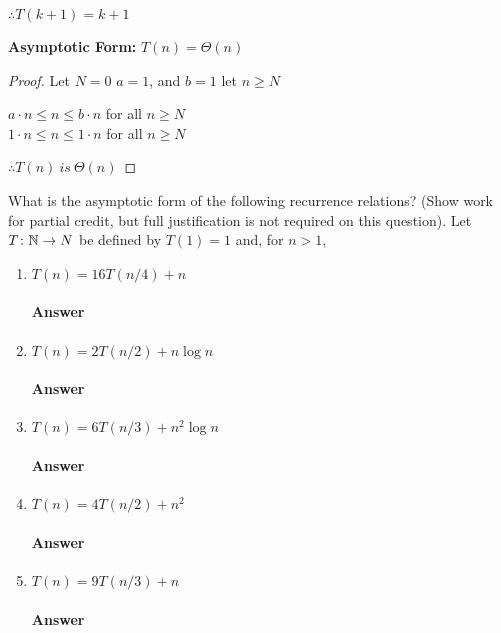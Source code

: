 \documentclass{article}
\begin{document}
$\therefore T(k+1)=k+1$

{\bf Asymptotic Form:} $T(n)=\Theta(n)$

\begin{proof}

Let $N = 0$
$a=1$, and $b= 1$
let $n \geq N$

$a \cdot n \leq n \leq b \cdot n$ for all $n \geq N$\\
$1 \cdot n \leq n \leq 1 \cdot n$ for all $n \geq N$

$\therefore T(n)\ is\ \Theta(n)$

\end{proof}




\collab{\todo{}}

What is the asymptotic form of the following recurrence
relations? (Show work for partial credit, but full justification is not required
on this question).
Let $T \colon {\mathbb N} \to N$ be defined by $T(1)=1$ and, for $n>1$,
\begin{enumerate}
	\item $T(n) = 16 T(n/4) + n$
	      \paragraph{Answer} \todo{}
	\item $T(n) = 2 T(n/2) + n \log{n}$
	      \paragraph{Answer} \todo{}
	\item $T(n) = 6 T(n/3) + n^2 \log{n}$
	      \paragraph{Answer} \todo{}
	\item $T(n) = 4 T(n/2) + n^2$
	      \paragraph{Answer} \todo{}
	\item $T(n) = 9 T(n/3) + n$
	      \paragraph{Answer} \todo{}
\end{enumerate}
\end{document}
